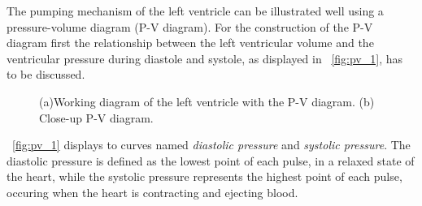 The pumping mechanism of the left ventricle can be illustrated well using a pressure-volume diagram (P-V diagram). For the construction of the P-V diagram first the relationship between the left ventricular volume and the ventricular pressure during diastole and systole, as displayed in \figurename~\ref{fig:pv_1}, has to be discussed.
\begin{figure}[h]
  \centering
  \caption[P-V diagram]{(a)Working diagram of the left ventricle with the P-V diagram. (b) Close-up P-V diagram. \cite{GH20}}
  \label{fig:pv}
\end{figure}
\figurename~\ref{fig:pv_1} displays to curves named \textit{diastolic pressure} and \textit{systolic pressure}. The diastolic pressure is defined as the lowest point of each pulse, in a relaxed state of the heart, while the systolic pressure represents the highest point of each pulse, occuring when the heart is contracting and ejecting blood. \cite{HKS4}

